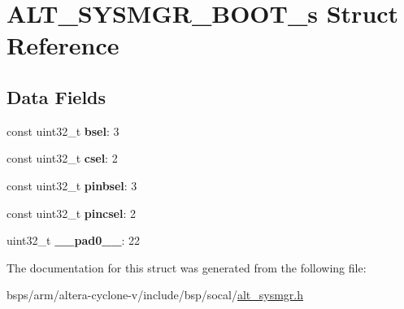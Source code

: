 \hypertarget{structALT__SYSMGR__BOOT__s}{}\section{A\+L\+T\+\_\+\+S\+Y\+S\+M\+G\+R\+\_\+\+B\+O\+O\+T\+\_\+s Struct Reference}
\label{structALT__SYSMGR__BOOT__s}
\subsection*{Data Fields}
\begin{DoxyCompactItemize}
\item 
\mbox{\label{structALT__SYSMGR__BOOT__s_a8001c92ee4935ba4375a4e2b8befba75}} 
const uint32\+\_\+t {\bfseries bsel}\+: 3
\item 
\mbox{\label{structALT__SYSMGR__BOOT__s_a5c2607c69e484757187a174b6a59b935}} 
const uint32\+\_\+t {\bfseries csel}\+: 2
\item 
\mbox{\label{structALT__SYSMGR__BOOT__s_abb32b0dd6eb206ec067f8d7ee54af1bc}} 
const uint32\+\_\+t {\bfseries pinbsel}\+: 3
\item 
\mbox{\label{structALT__SYSMGR__BOOT__s_a942e52ad4cd39c452904e0bb63d8712d}} 
const uint32\+\_\+t {\bfseries pincsel}\+: 2
\item 
\mbox{\label{structALT__SYSMGR__BOOT__s_a907ed62a2f0d62c1836b13888837a238}} 
uint32\+\_\+t {\bfseries \+\_\+\+\_\+pad0\+\_\+\+\_\+}\+: 22
\end{DoxyCompactItemize}


The documentation for this struct was generated from the following file\+:\begin{DoxyCompactItemize}
\item 
bsps/arm/altera-\/cyclone-\/v/include/bsp/socal/\mbox{\hyperlink{alt__sysmgr_8h}{alt\+\_\+sysmgr.\+h}}\end{DoxyCompactItemize}
